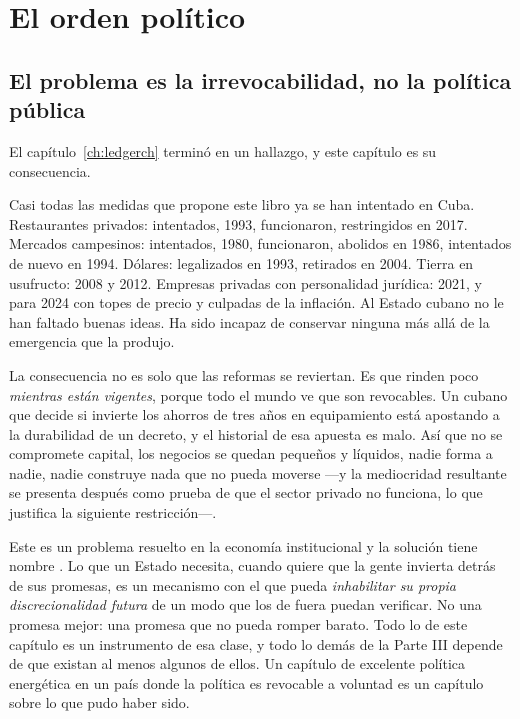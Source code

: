 \chapter{El orden político}
\label{ch:polity}

\section{El problema es la irrevocabilidad, no la política pública}

El capítulo~\ref{ch:ledgerch} terminó en un hallazgo, y este capítulo es su
consecuencia.

Casi todas las medidas que propone este libro ya se han intentado en Cuba.
Restaurantes privados: intentados, 1993, funcionaron, restringidos en 2017.
Mercados campesinos: intentados, 1980, funcionaron, abolidos en 1986, intentados de
nuevo en 1994. Dólares: legalizados en 1993, retirados en 2004. Tierra en
usufructo: 2008 y 2012. Empresas privadas con personalidad jurídica: 2021, y para
2024 con topes de precio y culpadas de la inflación. Al Estado cubano no le han
faltado buenas ideas. Ha sido incapaz de conservar ninguna más allá de la
emergencia que la produjo.

La consecuencia no es solo que las reformas se reviertan. Es que rinden poco
\emph{mientras están vigentes}, porque todo el mundo ve que son revocables. Un
cubano que decide si invierte los ahorros de tres años en equipamiento está
apostando a la durabilidad de un decreto, y el historial de esa apuesta es malo.
Así que no se compromete capital, los negocios se quedan pequeños y líquidos, nadie
forma a nadie, nadie construye nada que no pueda moverse ---y la mediocridad
resultante se presenta después como prueba de que el sector privado no funciona, lo
que justifica la siguiente restricción---.

Este es un problema resuelto en la economía institucional y la solución tiene nombre
\citep{northweingast1989}. Lo que un Estado necesita, cuando quiere que la gente
invierta detrás de sus promesas, es un mecanismo con el que pueda \emph{inhabilitar
su propia discrecionalidad futura} de un modo que los de fuera puedan verificar. No
una promesa mejor: una promesa que no pueda romper barato. Todo lo de este capítulo
es un instrumento de esa clase, y todo lo demás de la Parte III depende de que
existan al menos algunos de ellos. Un capítulo de excelente política energética en
un país donde la política es revocable a voluntad es un capítulo sobre lo que pudo
haber sido.

